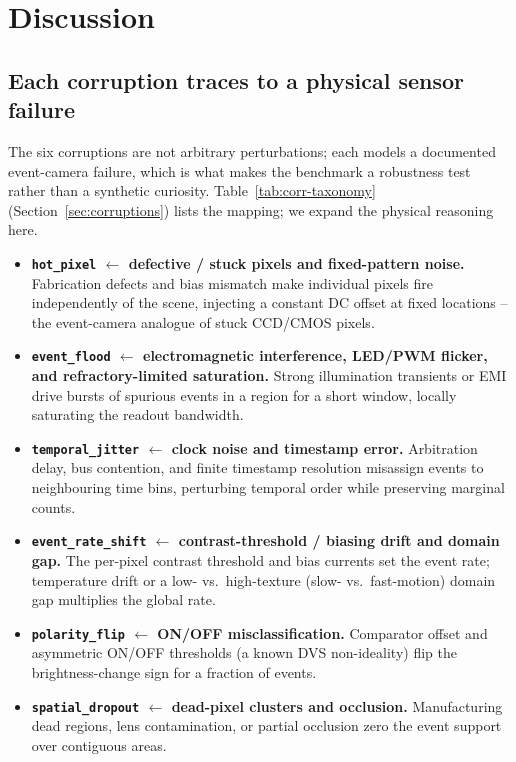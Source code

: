 \section{Discussion}
\label{sec:discussion}

\subsection{Each corruption traces to a physical sensor failure}
\label{sec:discussion-physical}

The six corruptions are not arbitrary perturbations; each models a documented event-camera
failure, which is what makes the benchmark a robustness test rather than a synthetic
curiosity. Table~\ref{tab:corr-taxonomy} (Section~\ref{sec:corruptions}) lists the mapping;
we expand the physical reasoning here.

\begin{itemize}
  \item \textbf{\texttt{hot\_pixel} $\leftarrow$ defective / stuck pixels and fixed-pattern
        noise.} Fabrication defects and bias mismatch make individual pixels fire
        independently of the scene, injecting a constant DC offset at fixed locations -- the
        event-camera analogue of stuck CCD/CMOS pixels.
  \item \textbf{\texttt{event\_flood} $\leftarrow$ electromagnetic interference, LED/PWM
        flicker, and refractory-limited saturation.} Strong illumination transients or EMI
        drive bursts of spurious events in a region for a short window, locally saturating the
        readout bandwidth.
  \item \textbf{\texttt{temporal\_jitter} $\leftarrow$ clock noise and timestamp error.}
        Arbitration delay, bus contention, and finite timestamp resolution misassign events
        to neighbouring time bins, perturbing temporal order while preserving marginal counts.
  \item \textbf{\texttt{event\_rate\_shift} $\leftarrow$ contrast-threshold / biasing drift
        and domain gap.} The per-pixel contrast threshold and bias currents set the event
        rate; temperature drift or a low- vs.\ high-texture (slow- vs.\ fast-motion) domain
        gap multiplies the global rate.
  \item \textbf{\texttt{polarity\_flip} $\leftarrow$ ON/OFF misclassification.} Comparator
        offset and asymmetric ON/OFF thresholds (a known DVS non-ideality) flip the
        brightness-change sign for a fraction of events.
  \item \textbf{\texttt{spatial\_dropout} $\leftarrow$ dead-pixel clusters and occlusion.}
        Manufacturing dead regions, lens contamination, or partial occlusion zero the event
        support over contiguous areas.
\end{itemize}

